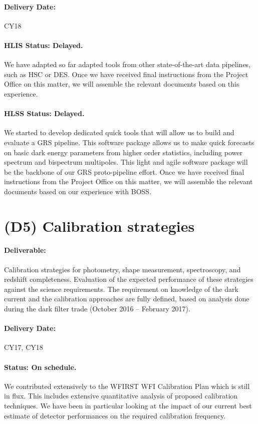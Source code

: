 \paragraph*{Delivery Date:} CY18

\paragraph*{HLIS Status: Delayed.} We have adapted so far adapted tools from other state-of-the-art data pipelines, such as HSC or DES. Once we have received final instructions from the Project Office on this matter, we will assemble the relevant documents based on this experience.

\paragraph*{HLSS Status: Delayed.} We started to develop dedicated quick tools that
will allow us to build and evaluate a GRS pipeline. This software package allows us to make quick forecasts on basic dark energy parameters from higher order statistics, including power spectrum and bispectrum multipoles. This light and agile software package will be the backbone of our GRS proto-pipeline effort. Once we have received final instructions from the Project Office on this matter, we will assemble the relevant documents based on our experience with BOSS.

\section*{(D5) Calibration strategies}

\paragraph*{Deliverable:} Calibration strategies for photometry, shape
measurement, spectroscopy, and redshift completeness. Evaluation of the expected
performance of these strategies against the science requirements. The
requirement on knowledge of the dark current and the calibration approaches are
fully defined, based on analysis done during the dark filter trade (October 2016
-- February 2017).

\paragraph*{Delivery Date:} CY17, CY18

\paragraph*{Status: On schedule.} We contributed extensively to the WFIRST WFI Calibration Plan which is still in flux. This includes extensive quantitative analysis of proposed calibration techniques. We have been in particular looking at the impact of our current best estimate of detector performances on the required calibration frequency.


